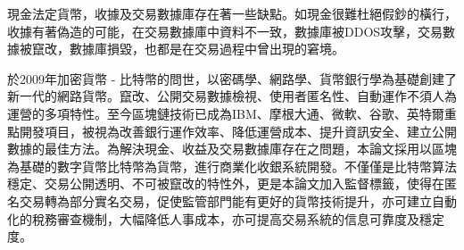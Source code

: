 
現金法定貨幣，收據及交易數據庫存在著一些缺點。如現金很難杜絕假鈔的橫行，收據有著偽造的可能，在交易數據庫中資料不一致，數據庫被DDOS攻擊，交易數據被竄改，數據庫損毀，也都是在交易過程中曾出現的窘境。

於2009年加密貨幣 - 比特幣的問世，以密碼學、網路學、貨幣銀行學為基礎創建了新一代的網路貨幣。竄改、公開交易數據檢視、使用者匿名性、自動運作不須人為運營的多項特性。至今區塊鏈技術已成為IBM、摩根大通、微軟、谷歌、英特爾重點開發項目，被視為改善銀行運作效率、降低運營成本、提升資訊安全、建立公開數據的最佳方法。為解決現金、收益及交易數據庫存在之問題，本論文採用以區塊為基礎的數字貨幣比特幣為貨幣，進行商業化收銀系統開發。不僅僅是比特幣算法穩定、交易公開透明、不可被竄改的特性外，更是本論文加入監督標籤，使得在匿名交易轉為部分實名交易，促使監管部門能有更好的貨幣技術提升，亦可建立自動化的稅務審查機制，大幅降低人事成本，亦可提高交易系統的信息可靠度及穩定度。
